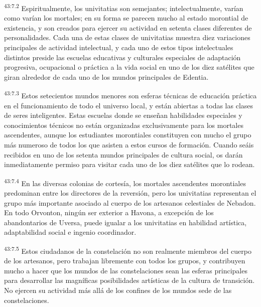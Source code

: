 \par
\textsuperscript{43:7.2} Espiritualmente, los univitatias son semejantes; intelectualmente, varían como varían los mortales; en su forma se parecen mucho al estado morontial de existencia, y son creados para ejercer su actividad en setenta clases diferentes de personalidades. Cada una de estas clases de univitatias muestra diez variaciones principales de actividad intelectual, y cada uno de estos tipos intelectuales distintos preside las escuelas educativas y culturales especiales de adaptación progresiva, ocupacional o práctica a la vida social en uno de los diez satélites que giran alrededor de cada uno de los mundos principales de Edentia.

\par
\textsuperscript{43:7.3} Estos setecientos mundos menores son esferas técnicas de educación práctica en el funcionamiento de todo el universo local, y están abiertas a todas las clases de seres inteligentes. Estas escuelas donde se enseñan habilidades especiales y conocimientos técnicos no están organizadas exclusivamente para los mortales ascendentes, aunque los estudiantes morontiales constituyen con mucho el grupo más numeroso de todos los que asisten a estos cursos de formación. Cuando seáis recibidos en uno de los setenta mundos principales de cultura social, os darán inmediatamente permiso para visitar cada uno de los diez satélites que lo rodean.

\par
\textsuperscript{43:7.4} En las diversas colonias de cortesía, los mortales ascendentes morontiales predominan entre los directores de la reversión, pero los univitatias representan el grupo más importante asociado al cuerpo de los artesanos celestiales de Nebadon. En todo Orvonton, ningún ser exterior a Havona, a excepción de los abandontarios de Uversa, puede igualar a los univitatias en habilidad artística, adaptabilidad social e ingenio coordinador.

\par
\textsuperscript{43:7.5} Estos ciudadanos de la constelación no son realmente miembros del cuerpo de los artesanos, pero trabajan libremente con todos los grupos, y contribuyen mucho a hacer que los mundos de las constelaciones sean las esferas principales para desarrollar las magníficas posibilidades artísticas de la cultura de transición. No ejercen su actividad más allá de los confines de los mundos sede de las constelaciones.

